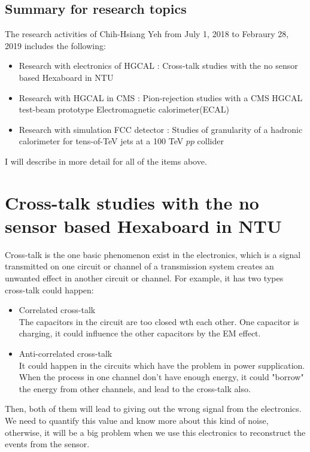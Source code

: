 \subsection{Summary for research topics}
The research activities of Chih-Hsiang Yeh from July 1, 2018 to Febraury 28, 2019 includes the following:
\begin{itemize}
 \item Research with electronics of HGCAL : Cross-talk studies with the no sensor based Hexaboard in NTU 
 \item Research with HGCAL in CMS : Pion-rejection studies with a CMS HGCAL test-beam prototype Electromagnetic calorimeter(ECAL)
 \item Research with simulation FCC detector : Studies of granularity of a hadronic calorimeter for tens-of-TeV jets at a 100 TeV $pp$ collider
\end{itemize}

I will describe in more detail for all of the items above.
\section{Cross-talk studies with the no sensor based Hexaboard in NTU \label{sec:cross-talk}}
Cross-talk is the one basic phenomenon exist in the electronics, which is a signal transmitted on one circuit or channel of a transmission system creates an unwanted effect in another circuit or channel. For example, it has two types cross-talk could happen:
\begin{itemize}
\item Correlated cross-talk\\
The capacitors in the circuit are too closed wth each other. One capacitor is charging, it could influence the other capacitors by the EM effect. 
\item Anti-correlated cross-talk\\
It could happen in the circuits which have the problem in power supplication. When the process in one channel don't have enough energy, it could "borrow" the energy from other channels, and lead to the cross-talk also.  
\end{itemize}


Then, both of them will lead to giving out the wrong signal from the electronics. We need to quantify this value and know more about this kind of noise, otherwise, it will be a big problem when we use this electronics to reconstruct the events from the sensor. 

